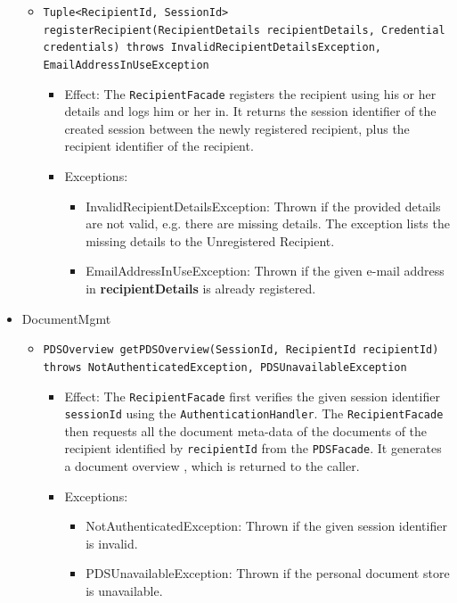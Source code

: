 \documentclass[a4paper,10pt]{article}
\begin{document}
\begin{itemize}
\begin{itemize}
         \item \texttt{Tuple<RecipientId, SessionId> registerRecipient(RecipientDetails recipientDetails, Credential credentials) throws InvalidRecipientDetailsException, EmailAddressInUseException}
            \begin{itemize}
                \item Effect: The \texttt{RecipientFacade} registers the recipient using his or her details and logs him or her in. It returns the session identifier of the created session between the newly registered recipient, plus the recipient identifier of the recipient.
                \item Exceptions: 
                \begin{itemize}
                	\item InvalidRecipientDetailsException: Thrown if the provided details are not valid, e.g. there are missing details. The exception lists the missing details to the Unregistered Recipient.
                	\item EmailAddressInUseException: Thrown if the given e-mail address in \textbf{recipientDetails} is already registered.
                \end{itemize}
            \end{itemize}           
            
        \end{itemize}
    

    \item DocumentMgmt
    \begin{itemize}
        \item \texttt{PDSOverview getPDSOverview(SessionId, RecipientId recipientId)\\ throws NotAuthenticatedException, PDSUnavailableException}
        \begin{itemize}
            \item Effect: The \texttt{RecipientFacade} first verifies the given session identifier \texttt{sessionId} using the \texttt{AuthenticationHandler}. The \texttt{RecipientFacade} then requests all the document meta-data of the documents of the recipient identified by \texttt{recipientId} from the \texttt{PDSFacade}. It generates a document overview , which is returned  to the caller.
            \item Exceptions:
             \begin{itemize}
                \item NotAuthenticatedException: Thrown if the given session identifier is invalid.
                \item PDSUnavailableException: Thrown if the personal document store is unavailable.
            \end{itemize}       	
        \end{itemize}
      

\end{itemize}
\end{itemize}
\end{document}
